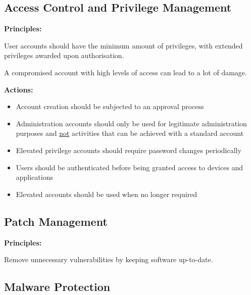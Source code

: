 \documentclass{article}
\begin{document}
\subsection{Access Control and Privilege Management}

\textbf{Principles:}

User accounts should have the minimum amount of privileges, with extended privileges awarded upon authorisation.

A compromised account with high levels of access can lead to a lot of damage.

\textbf{Actions:}

\begin{itemize}
\item 
  Account creation should be subjected to an approval process
\item 
  Administration accounts should only be used for legitimate administration purposes and \underline{not} activities that can be achieved with a standard account
\item 
  Elevated privilege accounts should require password changes periodically
\item 
  Users should be authenticated before being granted access to devices and applications
\item 
  Elevated accounts should be used when no longer required
\end{itemize}

\subsection{Patch Management}

\textbf{Principles:}

Remove unnecessary vulnerabilities by keeping software up-to-date.

\subsection{Malware Protection}
\end{document}
